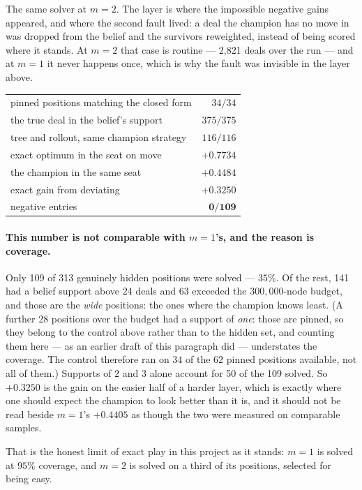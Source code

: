 \documentclass[11pt,a4paper]{article}
\begin{document}
The same solver at $m = 2$. The layer is where the impossible negative gains
appeared, and where the second fault lived: a deal the champion has no move in
was dropped from the belief and the survivors reweighted, instead of being
scored where it stands. At $m = 2$ that case is routine --- 2,821 deals over
the run --- and at $m = 1$ it never happens once, which is why the fault was
invisible in the layer above.

\begin{center}
\begin{tabular}{lr}
\toprule
pinned positions matching the closed form & $34/34$ \\
the true deal in the belief's support & $375/375$ \\
tree and rollout, same champion strategy & $116/116$ \\
\midrule
exact optimum in the seat on move & $+0.7734$ \\
the champion in the same seat & $+0.4484$ \\
\midrule
exact gain from deviating & $\mathbf{+0.3250}$ \\
negative entries & $\mathbf{0/109}$ \\
\bottomrule
\end{tabular}
\end{center}

\paragraph{This number is not comparable with $m = 1$'s, and the reason is
coverage.} Only 109 of 313 genuinely hidden positions were solved ---
$35\%$. Of the rest, 141 had a belief support above $24$ deals and 63 exceeded
the $300{,}000$-node budget, and those are the \emph{wide} positions: the ones
where the champion knows least. (A further 28 positions over the budget had a
support of \emph{one}: those are pinned, so they belong to the control above
rather than to the hidden set, and counting them here --- as an earlier draft
of this paragraph did --- understates the coverage. The control therefore ran
on $34$ of the $62$ pinned positions available, not all of them.) Supports of $2$ and $3$ alone account for
50 of the 109 solved. So $+0.3250$ is the gain on the easier half of a harder
layer, which is exactly where one should expect the champion to look better
than it is, and it should not be read beside $m = 1$'s $+0.4405$ as though the
two were measured on comparable samples.

That is the honest limit of exact play in this project as it stands: $m = 1$ is
solved at $95\%$ coverage, and $m = 2$ is solved on a third of its positions,
selected for being easy.
\end{document}
